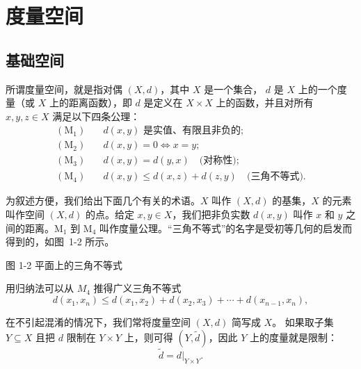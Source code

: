 \chapter{度量空间}
\section{基础空间}
\begin{definition}
所谓度量空间，就是指对偶 $(X,d)$，其中 $X$ 是一个集合，
$d$ 是 $X$ 上的一个度量（或 $X$ 上的距离函数），即 $d$ 是定义在
$X\times X$ 上的函数，并且对所有 $x,y,z\in X$ 满足以下四条公理：
\begin{align*}
(\mathrm{M}_1) \quad & d(x,y) \text{ 是实值、有限且非负的}; \\
(\mathrm{M}_2) \quad & d(x,y)=0 \iff x=y; \\
(\mathrm{M}_3) \quad & d(x,y)=d(y,x) \quad \text{(对称性)}; \\
(\mathrm{M}_4) \quad & d(x,y)\le d(x,z)+d(z,y) \quad \text{(三角不等式)}.
\end{align*}
\end{definition}
为叙述方便，我们给出下面几个有关的术语。$X$ 叫作 $(X,d)$ 的基集，$X$ 的元素叫作空间 $(X,d)$ 的点。给定 $x,y \in X$，我们把非负实数 $d(x,y)$ 叫作 $x$ 和 $y$ 之间的距离。M$_1$ 到 M$_4$ 叫作度量公理。“三角不等式”的名字是受初等几何的启发而得到的，如图~1-2 所示。

\begin{center}

图 1-2 \quad 平面上的三角不等式
\end{center}
用归纳法可以从 $M_4$ 推得广义三角不等式
\[
d(x_1,x_n) \le d(x_1,x_2) + d(x_2,x_3) + \cdots + d(x_{n-1},x_n), \tag{1.1.1}
\]

在不引起混淆的情况下，我们常将度量空间 $(X,d)$ 简写成 $X$。  
如果取子集 $Y \subseteq X$ 且把 $d$ 限制在 $Y \times Y$ 上，则可得 $(Y,\tilde d)$，因此 $Y$ 上的度量就是限制：
\[
\tilde d = d|_{Y \times Y}.
\]

